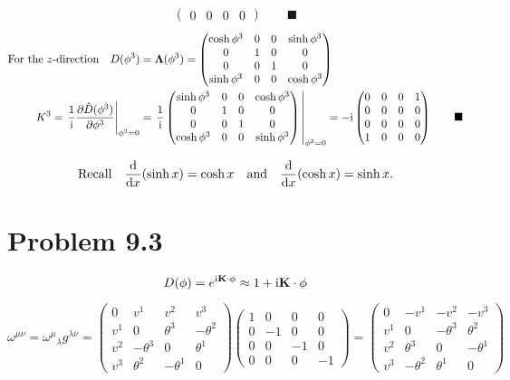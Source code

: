 \documentclass{article}
\begin{document}
\begin{align*}
\begin{pmatrix}
		0&0&0&0
		\end{pmatrix}\qquad\blacksquare
\end{align*}\begin{align*}
\qq*{For the $z$-direction}D(\phi^3)&=\vb{\Lambda}(\phi^3)=\begin{pmatrix}
\cosh{\phi^3}&0&0&\sinh{\phi^3}\\
0&1 & 0&0 \\ 
0 & 0&1&0\\
\sinh{\phi^3}&0&0&\cosh{\phi^3}
\end{pmatrix}\\
K^3=\eval{\frac{1}{\text{i}}\pdv{\hat{D}(\phi^3)}{\phi^3}}_{\phi^3=0}&=\eval{\frac{1}{\text{i}}\begin{pmatrix}
		\sinh{\phi^3}&0&0&\cosh{\phi^3}\\
0&1 & 0&0 \\ 
0 & 0&1&0\\
\cosh{\phi^3}&0&0&\sinh{\phi^3}
		\end{pmatrix}}_{\phi^3=0}=-\text{i}\begin{pmatrix}
		0&0&0&1\\
		0 & 0&0&0\\
		0&0&0&0 \\
		1&0 & 0&0 
		\end{pmatrix}\qquad\blacksquare
\end{align*}

\[\qq*{Recall}\dv{x}(\sinh x)=\cosh x\qand\dv{x}(\cosh x)=\sinh x.\]



\section*{Problem 9.3}
\[D(\vb{\phi})=e^{\text{i}\vb{K}\cdot\vb{\phi}}\approx 1+\text{i}\vb{K}\cdot\vb{\phi}
\]




\[\omega^{\mu\nu}={\omega^\mu}_\lambda g^{\lambda\nu}=\begin{pmatrix}0&v^1&v^2&v^3\\v^1&0&\theta^3&-\theta^2\\v^2&-\theta^3&0&\theta^1\\v^3&\theta^2&-\theta^1&0\end{pmatrix}
\begin{pmatrix}1&0&0&0\\0&-1&0&0\\0&0&-1&0\\0&0&0&-1\end{pmatrix}=
\begin{pmatrix}0&-v^1&-v^2&-v^3\\v^1&0&-\theta^3&\theta^2\\v^2&\theta^3&0&-\theta^1\\v^3&-\theta^2&\theta^1&0\end{pmatrix}\]
\end{document}
